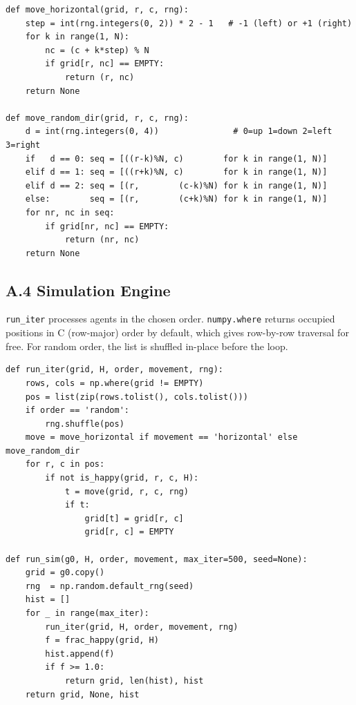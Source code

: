 \documentclass[11pt, a4paper]{article}
\begin{document}
\begin{lstlisting}
def move_horizontal(grid, r, c, rng):
    step = int(rng.integers(0, 2)) * 2 - 1   # -1 (left) or +1 (right)
    for k in range(1, N):
        nc = (c + k*step) % N
        if grid[r, nc] == EMPTY:
            return (r, nc)
    return None

def move_random_dir(grid, r, c, rng):
    d = int(rng.integers(0, 4))               # 0=up 1=down 2=left 3=right
    if   d == 0: seq = [((r-k)%N, c)        for k in range(1, N)]
    elif d == 1: seq = [((r+k)%N, c)        for k in range(1, N)]
    elif d == 2: seq = [(r,        (c-k)%N) for k in range(1, N)]
    else:        seq = [(r,        (c+k)%N) for k in range(1, N)]
    for nr, nc in seq:
        if grid[nr, nc] == EMPTY:
            return (nr, nc)
    return None
\end{lstlisting}

\subsection*{A.4 \quad Simulation Engine}

\texttt{run\_iter} processes agents in the chosen order.
\texttt{numpy.where} returns occupied positions in C (row-major) order by default,
which gives row-by-row traversal for free.
For random order, the list is shuffled in-place before the loop.

\begin{lstlisting}
def run_iter(grid, H, order, movement, rng):
    rows, cols = np.where(grid != EMPTY)
    pos = list(zip(rows.tolist(), cols.tolist()))
    if order == 'random':
        rng.shuffle(pos)
    move = move_horizontal if movement == 'horizontal' else move_random_dir
    for r, c in pos:
        if not is_happy(grid, r, c, H):
            t = move(grid, r, c, rng)
            if t:
                grid[t] = grid[r, c]
                grid[r, c] = EMPTY

def run_sim(g0, H, order, movement, max_iter=500, seed=None):
    grid = g0.copy()
    rng  = np.random.default_rng(seed)
    hist = []
    for _ in range(max_iter):
        run_iter(grid, H, order, movement, rng)
        f = frac_happy(grid, H)
        hist.append(f)
        if f >= 1.0:
            return grid, len(hist), hist
    return grid, None, hist
\end{lstlisting}
\end{document}
